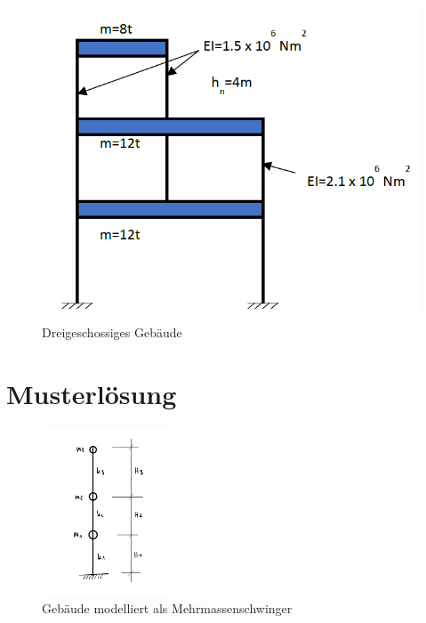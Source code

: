 \documentclass[
  letterpaper,
  DIV=11]{scrreprt}
\begin{document}
\begin{figure}[H]

{\centering \includegraphics[width=\textwidth,height=0.5\textheight]{bilder/mms_7_modell.png}

}

\caption{\label{fig-3mms}Dreigeschossiges Gebäude}

\end{figure}

\newpage{}

\hypertarget{musterluxf6sung-11}{%
\section{Musterlösung}\label{musterluxf6sung-11}}

\begin{figure}[H]

{\centering \includegraphics[width=\textwidth,height=50mm]{bilder/system_mms3.png}

}

\caption{Gebäude modelliert als Mehrmassenschwinger}

\end{figure}
\end{document}
